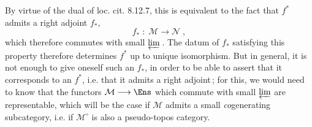 By virtue of the dual of loc. cit. 8.12.7, this is equivalent to the fact that $f^*$ admits a right adjoint $f_*$,
\[
f_* \;:\; \mathcal{M} \longrightarrow \mathcal{N}\;,
\tag*{(4.1.2)}
\]
which therefore commutes with small $\varprojlim$\,. The datum of $f_*$ satisfying this property therefore determines $f^*$ up to unique isomorphism. But in general, it is not enough to give oneself such an $f_*$, in order to be able to assert that it corresponds to an $f^*$, i.e. that it admits a right adjoint\,; for this, we would need to know that the functors $\mathcal{M}\longrightarrow\Ens$ which commute with small $\varprojlim$ are representable, which will be the case if $\mathcal{M}$ admits a small \textit{co}generating subcategory, i.e. if $\mathcal{M}^\circ$ is also a pseudo-topos category. %

\newpage